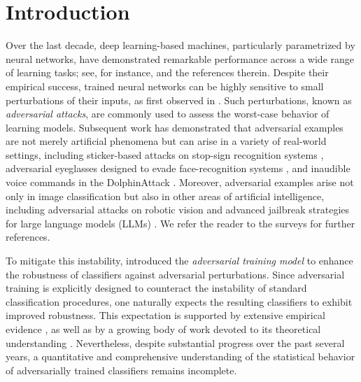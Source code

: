 \documentclass{amsart}
\theoremstyle{plain}
\numberwithin{equation}{section}\newtheorem{theorem}{Theorem}[section]
\theoremstyle{remark}
\begin{document}
\section{Introduction}
Over the last decade, deep learning-based machines, particularly parametrized by neural networks, have demonstrated remarkable performance across a wide range of learning tasks; see, for instance, \cite{lecun2015deep, krizhevsky2012imagenet} and the references therein. Despite their empirical success, trained neural networks can be highly sensitive to small perturbations of their inputs, as first observed in \cite{SzegedyZSBEGF13}. Such perturbations, known as \emph{adversarial attacks}, are commonly used to assess the worst-case behavior of learning models. Subsequent work has demonstrated that adversarial examples are not merely artificial phenomena but can arise in a variety of real-world settings, including sticker-based attacks on stop-sign recognition systems \cite{eykholt2018robust}, adversarial eyeglasses designed to evade face-recognition systems \cite{sharif2016accessorize}, and inaudible voice commands in the DolphinAttack \cite{10.1145/3133956.3134052}. Moreover, adversarial examples arise not only in image classification but also in other areas of artificial intelligence, including adversarial attacks on robotic vision \cite{jones2025adversarialattacksroboticvision} and advanced jailbreak strategies for large language models (LLMs) \cite{zou2023universal, 10.1145/3605764.3623985, jiang2024artprompt, pmlr-v267-sabbaghi25a}. We refer the reader to the surveys \cite{QIAN2022108889, zhao2024adversarialtrainingsurvey} for further references.

To mitigate this instability, \citet{goodfellow2014explaining} introduced the \emph{adversarial training model} to enhance the robustness of classifiers against adversarial perturbations. Since adversarial training is explicitly designed to counteract the instability of standard classification procedures, one naturally expects the resulting classifiers to exhibit improved robustness. This expectation is supported by extensive empirical evidence \cite{MadryMSTV18, li2025adversarial, BAN20243535}, as well as by a growing body of work devoted to its theoretical understanding \cite{bose2020adversarial, Meunier2021MixedNE, pmlr-v206-balcan23a, dobriban2023provable, javanmard2023adversarial, pmlr-v125-javanmard20a, hassani2024curse, li2025adversarial}. Nevertheless, despite substantial progress over the past several years, a quantitative and comprehensive understanding of the statistical behavior of adversarially trained classifiers remains incomplete.
\end{document}
